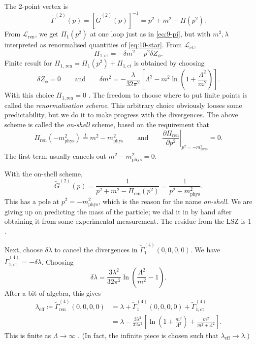 The 2-point vertex is
\begin{equation}
  \widetilde{\Gamma}^{(2)}(p) = [\widetilde{G}^{(2)}(p)]^{-1} = p^2 + m^2 - \Pi(p^2).
\end{equation}
From $\mathscr{L}_{\text{ren}}$, we get $\Pi_1(p^2)$ at one loop just as in \eqref{eq:9-pi}, but with $m^2, \lambda$ interpreted as renormalised quantities of \eqref{eq:10-star}.
From $\mathscr{L}_{\text{ct}}$, 
\begin{equation}
  \Pi_{1, \text{ct}} = - \delta m^2 - p^2 \delta Z_\phi.
\end{equation}
Finite result for $\Pi_{1 \text{, ren}} = \Pi_1(p^2) + \Pi_{1, \text{ct}}$  is obtained by choosing
 \begin{equation}
  \delta Z_\phi = 0 \qquad \text{and} \qquad \delta m^2 = -\frac{\lambda}{32 \pi^2} \left[ \Lambda^2 - m^2 \ln(1 + \frac{\Lambda^2}{m^2}) \right].
\end{equation}
With this choice $\Pi_{1, \text{ren}} = 0$ .
The freedom to choose where to put finite points is called the \emph{renormalisation scheme}.
This arbitrary choice obviously looses some predictability, but we do it to make progress with the divergences.
The above scheme is called the \emph{on-shell} scheme, based on the requirement that
\begin{equation}
  \Pi_{\text{ren}}(-m^2_{\text{phys}}) \stackrel{!}{=} m^2 - m^2_{\text{phys}} \qquad \text{and} \qquad
  \left.\frac{\partial \Pi_{\text{ren}}}{\partial p^2}\right\rvert_{p^2 = -m^2_{\text{phys}}} = 0.
\end{equation}
The first term usually cancels out $m^2 - m^2_{\text{phys}} = 0$.

With the on-shell scheme, 
\begin{equation}
  \widetilde{G}^{(2)}(p) = \frac{1}{p^2+ m^2 - \Pi_{\text{ren}}(p^2)} = \frac{1}{p^2 + m^2_{\text{phys}}}.
\end{equation}
This has a pole at $p^2 = -m^2_{\text{phys}}$, which is the reason for the name \emph{on-shell}.
We are giving up on predicting the mass of the particle; we dial it in by hand after obtaining it from some experimental measurement.
The residue from the LSZ is $1$.

Next, choose $\delta \lambda$ to cancel the divergences in $\widetilde{\Gamma}_1^{(4)}(0,0,0,0)$.
We have $\widetilde\Gamma_{1, \text{ct}}^{(4)} = -\delta \lambda$. Choosing
\begin{equation}
  \delta \lambda = \frac{3 \lambda^2}{32 \pi^2} \ln(\frac{\Lambda^2}{m^2} - 1).
\end{equation}
After a bit of algebra, this gives
\begin{align}
  \lambda_{\text{eff}} \coloneqq \widetilde{\Gamma}_{\text{ren}}^{(4)}(0,0,0,0) &= \lambda + \widetilde{\Gamma}_1^{(4)}(0,0,0,0) + \widetilde{\Gamma}_{1, \text{ct}}^{(4)} \\
										&= \lambda - \frac{3\lambda^2}{32 \pi^2} \left[ \ln(1 + \frac{m^2}{\Lambda^2}) + \frac{m^2}{m^2 + \Lambda^2} \right].
\end{align}
This is finite as $\Lambda \to \infty$ . (In fact, the infinite piece is chosen such that $\lambda_{\text{eff}} \to \lambda$.)

